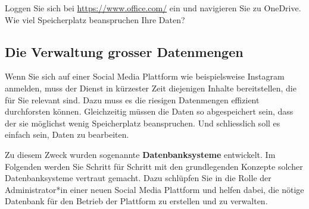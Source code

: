 \begin{myexercise}
  Loggen Sie sich bei \url{https://www.office.com/} ein und navigieren Sie zu OneDrive. Wie viel Speicherplatz beanspruchen Ihre Daten?
\end{myexercise}





\subsection{Die Verwaltung grosser Datenmengen}\label{subsec:Verwaltung}

Wenn Sie sich auf einer Social Media Plattform wie beispielsweise Instagram anmelden, muss der Dienst in kürzester Zeit diejenigen Inhalte bereitstellen, die für Sie relevant sind. Dazu muss es die riesigen Datenmengen effizient durchforsten können. Gleichzeitig müssen die Daten so abgespeichert sein, dass der sie möglichst wenig Speicherplatz beanspruchen. Und schliesslich soll es einfach sein, Daten zu bearbeiten.

Zu diesem Zweck wurden sogenannte \textbf{Datenbanksysteme} entwickelt. Im Folgenden werden Sie Schritt für Schritt mit den grundlegenden Konzepte solcher Datenbanksysteme vertraut gemacht. Dazu schlüpfen Sie in die Rolle der Administrator*in einer neuen Social Media Plattform und helfen dabei, die nötige Datenbank für den Betrieb der Plattform zu erstellen und zu verwalten.


